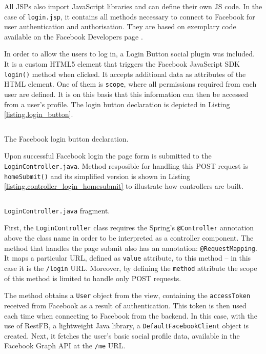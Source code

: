 \documentclass[12pt]{report}
\begin{document}
All JSPs also import JavaScript libraries and can define their own JS code. In the case of \texttt{login.jsp}, it contains all methods necessary to connect to Facebook for user authentication and authorisation. They are based on exemplary code available on the Facebook Developers page \cite{facebook_login_web}.

In order to allow the users to log in, a Login Button social plugin was included. It is a custom HTML5 element that triggers the Facebook JavaScript SDK \texttt{login()} method when clicked. It accepts additional data as attributes of the HTML element. One of them is \texttt{scope}, where all permissions required from each user are defined. It is on this basis that this information can then be accessed from a user's profile. The login button declaration is depicted in Listing \ref{listing.login_button}.

\begin{listing}
\inputminted[framesep=3mm,fontsize=\footnotesize,bgcolor=gray!20]{html}{code_login_button.html}
\caption{The Facebook login button declaration.}
\label{listing.login_button}
\end{listing}

Upon successful Facebook login the page form is submitted to the \texttt{Login\-Controller.java}. Method resposible for handling this POST request is \texttt{home\-Submit()} and its simplified version is shown in Listing \ref{listing.controller_login_homesubmit} to illustrate how controllers are built.

\begin{listing}[!t]
\inputminted[framesep=2mm,fontsize=\footnotesize,bgcolor=gray!20]{java}{code_controller_login.java}
\caption{\texttt{LoginController.java} fragment.}
\label{listing.controller_login_homesubmit}
\end{listing}

First, the \texttt{LoginController} class requires the Spring's \texttt{@Controller} annotation above the class name in order to be interpreted as a controller component. The method that handles the page submit also has an annotation: \texttt{@Request\-Mapping}. It maps a particular URL, defined as \texttt{value} attribute, to this method -- in this case it is the \texttt{/login} URL. Moreover, by defining the \texttt{method} attribute the scope of this method is limited to handle only POST requests.

The method obtains a \texttt{User} object from the view, containing the \texttt{access\-Token} received from Facebook as a result of authentication. This token is then used each time when connecting to Facebook from the backend. In this case, with the use of RestFB, a lightweight Java library, a \texttt{Default\-Facebook\-Client} object is created. Next, it fetches the user's basic social profile data, available in the Facebook Graph API at the \texttt{/me} URL.
\end{document}
